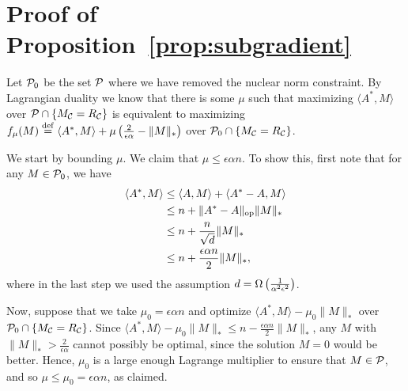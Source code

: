 \documentclass[11pt]{article}
\newcommand{\M}{\tilde{M}}
\newcommand{\Mm}{M^*}
\newcommand{\Aa}{A^*}
\begin{document}

\section{Proof of Proposition~\ref{prop:subgradient}}
Let $\mathcal{P}_0$ be the set $\mathcal{P}$ where we have removed the nuclear norm constraint. By Lagrangian duality we 
know that there is some $\mu$ such that maximizing $\langle \Aa, M \rangle$ over $\mathcal{P} \cap \{M_{\mathcal{C}} = R_{\mathcal{C}}\}$ 
is equivalent to maximizing $f_\mu(M) \eqdef \langle \Aa, M \rangle + \mu\p{\frac{2}{\epsilon\alpha} - \|M\|_*}$ over 
$\mathcal{P}_0 \cap \{M_{\mathcal{C}} = R_{\mathcal{C}}\}$. 

We start by bounding $\mu$. We claim that $\mu \leq \epsilon \alpha n$. 
To show this, first note that for any $M \in \mathcal{P}_0$, we have 
\begin{align}
\langle \Aa, M \rangle &\leq \langle A, M \rangle + \langle \Aa - A, M \rangle \\
 &\leq n + \|\Aa - A\|_{\op}\|M\|_* \\
 &\leq n + \frac{n}{\sqrt{d}}\|M\|_* \\
 &\leq n + \frac{\epsilon\alpha n}{2}\|M\|_*,
\end{align}
where in the last step we used the assumption $d = \Omega\left(\frac{1}{\alpha^2\epsilon^2}\right)$.

Now, suppose that we take $\mu_0 = \epsilon \alpha n$ and optimize $\langle \Aa, M \rangle - \mu_0\|M\|_*$ over 
$\mathcal{P}_0 \cap \{M_{\mathcal{C}} = R_{\mathcal{C}}\}$. Since $\langle \Aa, M \rangle - \mu_0\|M\|_* \leq n - \frac{\epsilon \alpha n}{2}\|M\|_*$, 
any $M$ with $\|M\|_* > \frac{2}{\epsilon\alpha}$ cannot possibly be optimal, since the solution $M = 0$ would 
be better. Hence, $\mu_0$ is a large enough Lagrange multiplier to ensure that $M \in \mathcal{P}$, and so 
$\mu \leq \mu_0 = \epsilon \alpha n$, as claimed.
\end{document}
